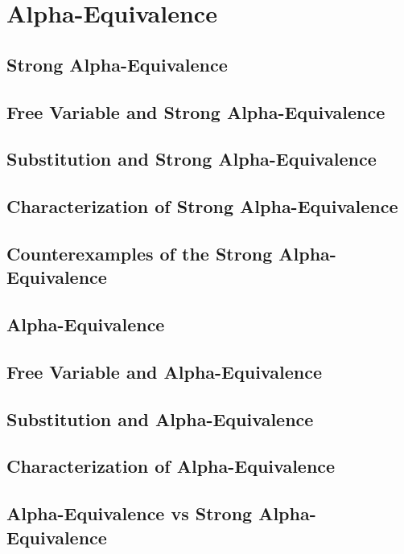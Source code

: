 \section{Alpha-Equivalence}
    \subsection{Strong Alpha-Equivalence}
      
    \subsection{Free Variable and Strong Alpha-Equivalence}
      
    \subsection{Substitution and Strong Alpha-Equivalence}
      
    \subsection{Characterization of Strong Alpha-Equivalence}
      
    \subsection{Counterexamples of the Strong Alpha-Equivalence}
      
    \subsection{Alpha-Equivalence}
      
    \subsection{Free Variable and Alpha-Equivalence}
      
    \subsection{Substitution and Alpha-Equivalence}
      
    \subsection{Characterization of Alpha-Equivalence}
      
    \subsection{Alpha-Equivalence vs Strong Alpha-Equivalence}
      
